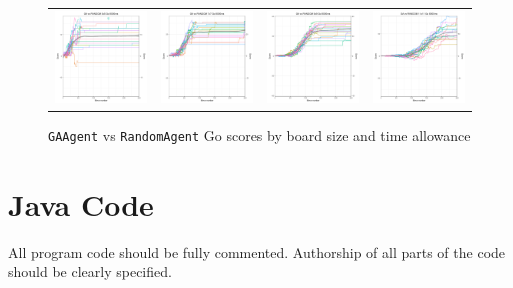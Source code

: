 \begin{figure}
\begin{tabular}{cccc}
\hspace{-0.5cm}\includegraphics[width = 1.55in]{images/Visualizations/GAvsRANDOM/8000ms5x5.png} &
\hspace{-0.5cm}\includegraphics[width = 1.55in]{images/Visualizations/GAvsRANDOM/8000ms7x7.png} &
\hspace{-0.5cm}\includegraphics[width = 1.55in]{images/Visualizations/GAvsRANDOM/8000ms9x9.png} &
\hspace{-0.5cm}\includegraphics[width = 1.55in]{images/Visualizations/GAvsRANDOM/8000ms11x11.png} \\
\end{tabular}
\caption{\texttt{GAAgent} vs \texttt{RandomAgent} Go scores by board size and time allowance}
\label{app:garandscore}
\end{figure}


\chapter{Java Code}\label{appa:code}
All program code should be fully commented. Authorship
of all parts of the code should be clearly specified. 

